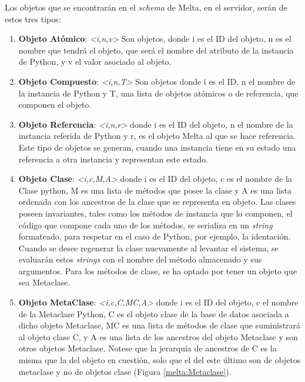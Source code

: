 \documentclass{melta}
\begin{document}
Los objetos que se encontrarán en el \textit{schema} de Melta, en el servidor, serán de estos tres tipos:
\begin{enumerate}
  \item \textbf{Objeto Atómico}: \textit{\textless i,n,v\textgreater} Son objetos, donde i es el ID del objeto, n es el nombre que tendrá el objeto, que será el nombre del atributo de la instancia de Python, y v el valor asociado al objeto. 
  \item \textbf{Objeto Compuesto}: \textit{\textless i,n,T\textgreater} Son objetos donde i es el ID, n el nombre de la instancia de Python y T, una lista de objetos atómicos o de referencia, que componen el objeto.
  \item \textbf{Objeto Referencia}: \textit{\textless i,n,r\textgreater} donde i es el ID del objeto, n el nombre de la instancia referida de Python y r, es el objeto Melta al que se hace referencia. Este tipo de objetos se generan, cuando una instancia tiene en su estado una referencia a otra instancia y representan este estado.
  \item \textbf{Objeto Clase}: \textit{\textless i,c,M,A\textgreater} donde i es el ID del objeto, c es el nombre de la Clase python, M es una lista de métodos que posee la clase y A es una lista ordenada con los ancestros de la clase que se representa en objeto. Las clases poseen invariantes, tales como los métodos de instancia que lo componen, el código que compone cada uno de los métodos, se serializa en un \textit{string} formateado, para respetar en el caso de Python, por ejemplo, la identación. Cuando se desee regenerar la clase nuevamente al levantar el sistema, se evaluarán estos \textit{strings} con el nombre del método almacenado y sus argumentos. Para los métodos de clase, se ha optado por tener un objeto que sea Metaclase.
  \item \textbf{Objeto MetaClase}:  \textit{\textless i,c,C,MC,A\textgreater} donde i es el ID del objeto, c el nombre de la Metaclase Python, C es el objeto clase de la base de datos asociada a dicho objeto Metaclase, MC es una lista de métodos de clase que suministrará al objeto clase C, y A es una lista de los ancestros del objeto Metaclase y son otros objetos Metaclase. Notese que la jerarquía de ancestros de C es la misma que la del objeto en cuestión, solo que el del este último son de objetos metaclase y no de objetos clase (Figura \ref{melta:Metaclase}).  
\end{enumerate}
\end{document}
